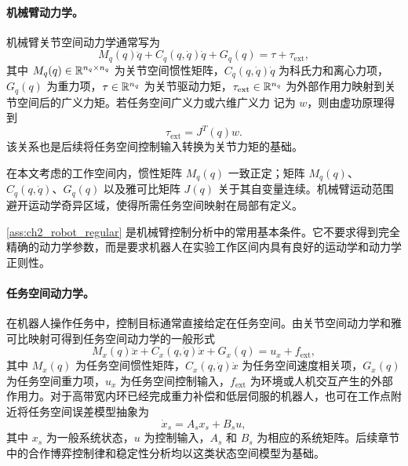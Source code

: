 \paragraph{机械臂动力学。}
\label{subsec:ch2_dynamics}

机械臂关节空间动力学通常写为
\begin{equation}
  M_q(q)\ddot q+C_q(q,\dot q)\dot q+G_q(q)=\tau+\tau_{\mathrm{ext}},
  \label{eq:ch2_joint_dynamics}
\end{equation}
其中 $M_q(q)\in\mathbb{R}^{n_q\times n_q}$ 为关节空间惯性矩阵，$C_q(q,\dot q)\dot q$ 为科氏力和离心力项，$G_q(q)$ 为重力项，$\tau\in\mathbb{R}^{n_q}$ 为关节驱动力矩，$\tau_{\mathrm{ext}}\in\mathbb{R}^{n_q}$ 为外部作用力映射到关节空间后的广义力矩。若任务空间广义力或六维广义力 记为 $w$，则由虚功原理得到
\begin{equation}
  \tau_{\mathrm{ext}}=J^T(q)w .
  \label{eq:ch2_jacobian_transpose}
\end{equation}
该关系也是后续将任务空间控制输入转换为关节力矩的基础。

\begin{assumption}[机械臂模型的正则性]
\label{ass:ch2_robot_regular}
在本文考虑的工作空间内，惯性矩阵 $M_q(q)$ 一致正定；矩阵 $M_q(q)$、$C_q(q,\dot q)$、$G_q(q)$ 以及雅可比矩阵 $J(q)$ 关于其自变量连续。机械臂运动范围避开运动学奇异区域，使得所需任务空间映射在局部有定义。
\end{assumption}

\begin{remark}
\cref{ass:ch2_robot_regular} 是机械臂控制分析中的常用基本条件。它不要求得到完全精确的动力学参数，而是要求机器人在实验工作区间内具有良好的运动学和动力学正则性。
\end{remark}

\paragraph{任务空间动力学。}
\label{subsec:ch2_task_dynamics}

在机器人操作任务中，控制目标通常直接给定在任务空间。由关节空间动力学和雅可比映射可得到任务空间动力学的一般形式
\begin{equation}
  M_x(q)\ddot x+C_x(q,\dot q)\dot x+G_x(q)=u_x+f_{\mathrm{ext}},
  \label{eq:ch2_task_dynamics}
\end{equation}
其中 $M_x(q)$ 为任务空间惯性矩阵，$C_x(q,\dot q)\dot x$ 为任务空间速度相关项，$G_x(q)$ 为任务空间重力项，$u_x$ 为任务空间控制输入，$f_{\mathrm{ext}}$ 为环境或人机交互产生的外部作用力。对于高带宽内环已经完成重力补偿和低层伺服的机器人，也可在工作点附近将任务空间误差模型抽象为
\begin{equation}
  \dot x_s=A_sx_s+B_su,
  \label{eq:ch2_general_state_space}
\end{equation}
其中 $x_s$ 为一般系统状态，$u$ 为控制输入，$A_s$ 和 $B_s$ 为相应的系统矩阵。后续章节中的合作博弈控制律和稳定性分析均以这类状态空间模型为基础。


